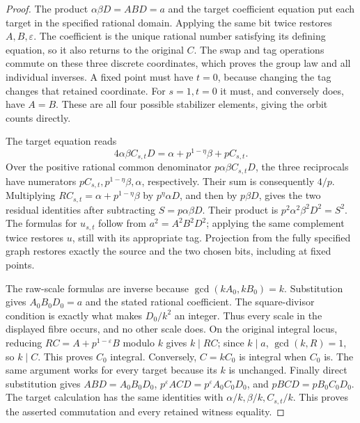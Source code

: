 \begin{proof}
The product \(\alpha\beta D=ABD=a\) and the target coefficient
equation put each target in the specified rational domain. Applying
the same bit twice restores \(A,B,\varepsilon\). The coefficient
is the unique rational number satisfying its defining equation, so
it also returns to the original \(C\). The swap and tag operations
commute on these three discrete coordinates, which proves the group
law and all individual inverses. A fixed point must have \(t=0\),
because changing the tag changes that retained coordinate. For
\(s=1,t=0\) it must, and conversely does, have \(A=B\).
These are all four possible stabilizer elements, giving the orbit
counts directly.

The target equation reads
\[
 4\alpha\beta C_{s,t}D
     =\alpha+p^{1-\eta}\beta+pC_{s,t}.
\]
Over the positive rational common denominator
\(p\alpha\beta C_{s,t}D\), the three reciprocals have
numerators \(pC_{s,t},p^{1-\eta}\beta,\alpha\), respectively.
Their sum is consequently \(4/p\). Multiplying
\(RC_{s,t}=\alpha+p^{1-\eta}\beta\) by
\(p^\eta\alpha D\), and then by \(p\beta D\), gives
the two residual identities after subtracting
\(S=p\alpha\beta D\). Their product is
\(p^2\alpha^2\beta^2D^2=S^2\). The formulas for
\(u_{s,t}\) follow from \(a^2=A^2B^2D^2\); applying the
same complement twice restores \(u\), still with its appropriate
tag. Projection from the fully specified graph restores exactly
the source and the two chosen bits, including at fixed points.

The raw-scale formulas are inverse because
\(\gcd(kA_0,kB_0)=k\). Substitution gives
\(A_0B_0D_0=a\) and the stated rational coefficient. The
square-divisor condition is exactly what makes \(D_0/k^2\)
an integer. Thus every scale in the displayed fibre occurs, and
no other scale does. On the original integral locus, reducing
\(RC=A+p^{1-\varepsilon}B\) modulo \(k\) gives
\(k\mid RC\); since \(k\mid a\), \(\gcd(k,R)=1\), so
\(k\mid C\). This proves \(C_0\) integral. Conversely,
\(C=kC_0\) is integral when \(C_0\) is. The same argument
works for every target because its \(k\) is unchanged.
Finally direct substitution gives
\(ABD=A_0B_0D_0\),
\(p^\varepsilon ACD=p^\varepsilon A_0C_0D_0\), and
\(pBCD=pB_0C_0D_0\). The target calculation has the same
identities with \(\alpha/k,\beta/k,C_{s,t}/k\). This proves
the asserted commutation and every retained witness equality.
\end{proof}

